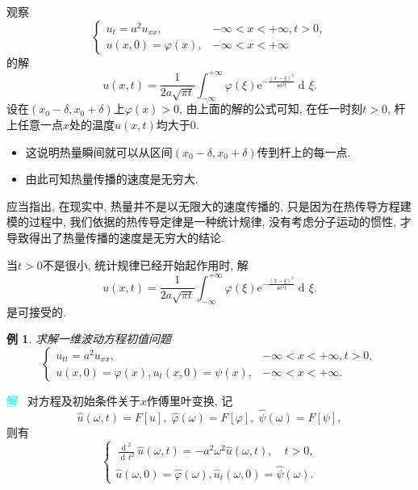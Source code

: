 \documentclass[aspectratio=169,notheorems,12pt,compress,UTF8]{ctexbeamer} %
\DeclareMathOperator\dif{d\!}
\def\dfrac{\displaystyle\frac}
\newcommand{\me}{\mathrm{e}}
\newcommand{\spb}{\vspace{3mm}}
\newtheorem{example}{例}
\begin{document}
\begin{frame}
\qquad 观察
\begin{equation*}
\left\{
\begin{array}{ll}
u_{t}=a^2u_{xx}, & -\infty<x<+\infty,t>0,\\
u(x,0)=\varphi(x), & -\infty<x<+\infty
\end{array}\right.
\end{equation*}
的解
\begin{equation*}
u(x,t)=\frac{1}{2a\sqrt{\pi
t}}\int_{-\infty}^{+\infty}\varphi(\xi)\me^{-\frac{(x-\xi)^2}{4a^2t}}\dif\xi.
\end{equation*}
设在$(x_0-\delta,x_0+\delta)$上$\varphi(x)>0$,
由上面的解的公式可知, 在任一时刻$t>0$,
杆上任意一点$x$处的温度$u(x,t)$均大于$0$. \pause
\begin{itemize}
\item 这说明热量瞬间就可以从区间$(x_0-\delta,x_0+\delta)$传到杆上的每一点.
\item 由此可知热量传播的速度是无穷大.
\end{itemize}
\end{frame}

\begin{frame}
\qquad 应当指出, {\heiti 在现实中, 热量并不是以无限大的速度传播的},
只是因为在热传导方程建模的过程中, 我们依据的热传导定律是一种统计规律,
没有考虑分子运动的惯性, 才导致得出了热量传播的速度是无穷大的结论. \pause\spb

当$t>0$不是很小, 统计规律已经开始起作用时, 解
\begin{equation*}
u(x,t)=\frac{1}{2a\sqrt{\pi
t}}\int_{-\infty}^{+\infty}\varphi(\xi)\me^{-\frac{(x-\xi)^2}{4a^2t}}\dif\xi.
\end{equation*}
是可接受的.
\end{frame}

\begin{frame}
\begin{example}\label{E10.7}
求解一维波动方程初值问题
\begin{equation*}
\left\{
\begin{array}{ll}
u_{tt}=a^2u_{xx}, & -\infty<x<+\infty,t>0,\\
u(x,0)=\varphi(x),u_t(x,0)=\psi(x), & -\infty<x<+\infty.
\end{array}\right.
\end{equation*}
\end{example}

\textcolor{cyan}{解~} 对方程及初始条件关于$x$作傅里叶变换,
记
$$
\widehat{u}(\omega,t)=F[u],\;\widehat{\varphi}(\omega)=F[\varphi],\;\widehat{\psi}(\omega)=F[\psi],
$$
则有
$$
\left\{
\begin{array}{l}
\dfrac{\dif^{\,2}}{\dif t^2}\widehat{u}(\omega,t)=-a^2\omega^2\widehat{u}(\omega,t),
\quad t>0,\\[3mm]
\widehat{u}(\omega,0)=\widehat{\varphi}(\omega),\widehat{u}_t(\omega,0)=\widehat{\psi}(\omega).
\end{array}\right.
$$
\end{frame}
\end{document}
